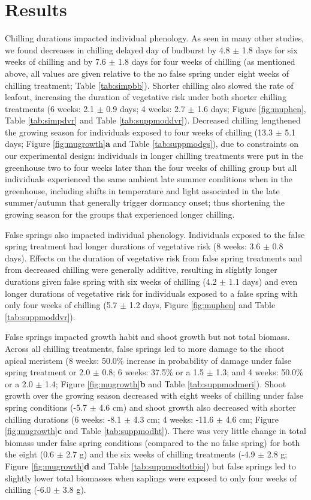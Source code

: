 \documentclass{article}\usepackage[]{graphicx}\usepackage[]{color}
\begin{document}
\section*{Results} 
Chilling durations impacted individual phenology. As seen in many other studies, we found decreases in chilling delayed day of budburst by 4.8 $\pm$ 1.8 days for six weeks of chilling and by 7.6 $\pm$ 1.8 days for four weeks of chilling (as mentioned above, all values are given relative to the no false spring under eight weeks of chilling treatment; Table \ref{tab:simpbb}). Shorter chilling also slowed the rate of leafout, increasing the duration of vegetative risk under both shorter chilling treatments (6 weeks: 2.1 $\pm$ 0.9 days; 4 weeks: 2.7 $\pm$ 1.6 days; Figure \ref{fig:muphen}, Table \ref{tab:simpdvr} and Table \ref{tab:suppmoddvr}). Decreased chilling lengthened the growing season for individuals exposed to four weeks of chilling (13.3 $\pm$ 5.1 days; Figure \ref{fig:mugrowth}\textbf{a} and Table \ref{tab:suppmodgs}), due to constraints on our experimental design: individuals in longer chilling treatments were put in the greenhouse two to four weeks later than the four weeks of chilling group but all individuals experienced the same ambient late summer conditions when in the greenhouse, including shifts in temperature and light associated in the late summer/autumn that generally trigger dormancy onset; thus shortening the growing season for the groups that experienced longer chilling. 
 
False springs also impacted individual phenology. Individuals exposed to the false spring treatment had longer durations of vegetative risk (8 weeks: 3.6 $\pm$ 0.8 days). Effects on the duration of vegetative risk from false spring treatments and from decreased chilling were generally additive, resulting in slightly longer durations given false spring with six weeks of chilling (4.2 $\pm$ 1.1 days) and even longer durations of vegetative risk for individuals exposed to a false spring with only four weeks of chilling (5.7 $\pm$ 1.2 days, Figure \ref{fig:muphen} and Table \ref{tab:suppmoddvr}).  

False springs impacted growth habit and shoot growth but not total biomass. Across all chilling treatments, false springs led to more damage to the shoot apical meristem (8 weeks: 50.0\% increase in probability of damage under false spring treatment or 2.0 $\pm$ 0.8; 6 weeks: 37.5\% or a 1.5 $\pm$ 1.3; and 4 weeks: 50.0\% or a 2.0 $\pm$ 1.4; Figure \ref{fig:mugrowth}\textbf{b} and Table \ref{tab:suppmodmeri}). Shoot growth over the growing season decreased with eight weeks of chilling under false spring conditions (-5.7 $\pm$ 4.6 cm) and shoot growth also decreased with shorter chilling durations (6 weeks: -8.1 $\pm$ 4.3 cm; 4 weeks: -11.6 $\pm$ 4.6 cm; Figure \ref{fig:mugrowth}\textbf{c} and Table \ref{tab:suppmodht}). There was very little change in total biomass under false spring conditions (compared to the no false spring) for both the eight (0.6 $\pm$ 2.7 g) and the six weeks of chilling treatments (-4.9 $\pm$ 2.8 g; Figure \ref{fig:mugrowth}\textbf{d} and Table \ref{tab:suppmodtotbio}) but false springs led to slightly lower total biomasses when saplings were exposed to only four weeks of chilling (-6.0 $\pm$ 3.8 g).
  
\end{document}
